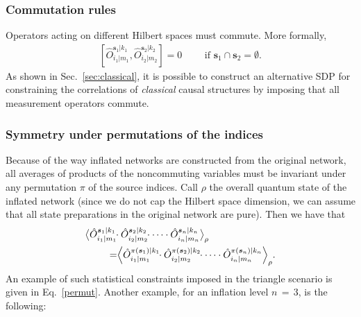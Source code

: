 \documentclass[superscriptaddress,aps,prx,nofootinbib,twocolumn,twoside,reprint,letterpaper,longbibliography]{revtex4-2}
\DeclarePairedDelimiter{\expec}{\langle}{\rangle}
\begin{document}
\subsubsection*{Commutation rules}
Operators acting on different Hilbert spaces must commute. More formally,
\begin{align}
\left[\hat{O}^{\boldsymbol{s}_1|k_1}_{i_1|m_1},\hat{O}^{\boldsymbol{s}_2|k_2}_{i_2|m_2}\right] =0
\qquad\text{ if }\boldsymbol{s}_1{\cap}\boldsymbol{s}_2{=}\emptyset.
\label{commutation:copies}
\end{align}
As shown in Sec.~\ref{sec:classical}, it is possible to construct an alternative SDP for constraining the correlations of \emph{classical} causal structures by imposing that all measurement operators commute.

\subsubsection*{Symmetry under permutations of the indices}
Because of the way inflated networks are constructed from the original network, all averages of products of the noncommuting variables must be invariant under any permutation $\pi$ of the source indices. Call $\rho$ the overall quantum state of the inflated network (since we do not cap the Hilbert space dimension, we can assume that all state preparations in the original network are pure). Then we have that
%
\begin{align}\begin{split}
  \label{eq:symconstraint}
  \big\langle\hat{O}^{\boldsymbol{s}_1|k_1}_{i_1|m_1} & \!\!\cdot \hat{O}^{\boldsymbol{s}_2|k_2}_{i_2|m_2}\!\!\cdot\dots\cdot\hat{O}^{\boldsymbol{s}_n|k_n}_{i_n|m_n}\big\rangle_\rho \\
  = &
  \expec*{\hat{O}^{\pi(\boldsymbol{s}_1)|k_1}_{i_1|m_1}  \!\!\cdot \hat{O}^{\pi(\boldsymbol{s}_2)|k_2}_{i_2|m_2}\!\!\cdot\dots\cdot\hat{O}^{\pi(\boldsymbol{s}_n)|k_n}_{i_n|m_n}}_\rho.
\end{split}\end{align}
An example of such statistical constraints imposed in the triangle scenario is given in Eq.~\eqref{permut}.
Another example, for an inflation level $n\,{=}\,3$, is the following:
\end{document}

